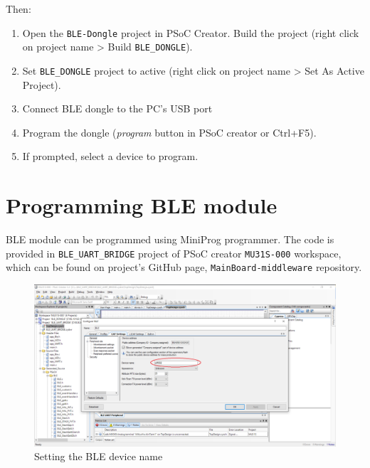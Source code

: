 Then:
\begin{enumerate}
	\item Open the \texttt{BLE-Dongle} project in PSoC Creator. Build the project (right click on project name > Build \texttt{BLE\_DONGLE}).
	\item Set \texttt{BLE\_DONGLE} project to active (right click on project name > Set As Active Project).
	\item Connect BLE dongle to the PC's USB port 
	\item Program the dongle (\textit{program} button in PSoC creator or Ctrl+F5).
	\item If prompted, select a device to program.
\end{enumerate}

\section{Programming BLE module}

BLE module can be programmed using MiniProg programmer. The code is provided in \texttt{BLE\_UART\_BRIDGE} project of PSoC creator \texttt{MU31S-000} workspace, which can be found on project's GitHub page, \texttt{MainBoard-middleware} repository.

\begin{figure}[htb]
    \centering
	  \includegraphics[width=\linewidth]{figures/BLE_device_name.PNG}
	\caption{Setting the BLE device name}
	\label{fig:ble_device_name}
\end{figure}

